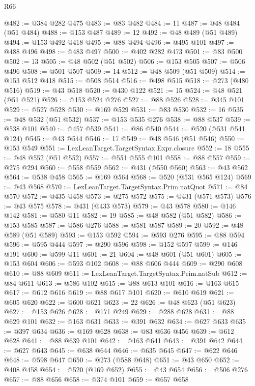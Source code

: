 \begin{lexlean}{R66}
\begin{coremodule}
@482 := @384 @282 @475
@483 := @83 @482
@484 := 11
@487 := @48 @484 (@51 @484)
@488 := @153 @487
@489 := 12
@492 := @48 @489 (@51 @489)
@494 := @153 @492 @418
@495 := @88 @494
@496 := @495 @101
@497 := @488 @496
@498 := @483 @497
@500 := @402 @282 @473
@501 := @83 @500
@502 := 13
@505 := @48 @502 (@51 @502)
@506 := @153 @505
@507 := @506 @496
@508 := @501 @507
@509 := 14
@512 := @48 @509 (@51 @509)
@514 := @153 @512 @418
@515 := @508 @514
@516 := @498 @515
@518 := @273 (@480 @516)
@519 := @43 @518
@520 := @430 @122
@521 := 15
@524 := @48 @521 (@51 @521)
@526 := @153 @524 @276
@527 := @88 @526
@528 := @345 @101
@529 := @527 @528
@530 := @169 @529
@531 := @83 @530
@532 := 16
@535 := @48 @532 (@51 @532)
@537 := @153 @535 @276
@538 := @88 @537
@539 := @538 @101
@540 := @457 @539
@541 := @86 @540
@544 := @520 (@531 @541 @124)
@545 := @43 @544
@546 := 17
@549 := @48 @546 (@51 @546)
@550 := @153 @549
@551 := LexLeanTarget.TargetSyntax.Expr.closure
@552 := 18
@555 := @48 @552 (@51 @552)
@557 := @551 @555 @101
@558 := @88 @557
@559 := @275 @294
@560 := @558 @559
@562 := @431 (@550 @560)
@563 := @43 @562
@564 := @538 @458
@565 := @169 @564
@568 := @520 (@531 @565 @124)
@569 := @43 @568
@570 := LexLeanTarget.TargetSyntax.Prim.natQuot
@571 := @84 @570
@572 := @435 @458
@573 := @275 @572
@575 := @431 (@571 @573)
@576 := @43 @575
@578 := @431 (@433 @573)
@579 := @43 @578
@580 := @146 @142
@581 := @580 @11
@582 := 19
@585 := @48 @582 (@51 @582)
@586 := @153 @585
@587 := @586 @276
@588 := @581 @587
@589 := 20
@592 := @48 @589 (@51 @589)
@593 := @153 @592
@594 := @593 @276
@595 := @88 @594
@596 := @595 @444
@597 := @290 @596
@598 := @152 @597
@599 := @146 @191
@600 := @599 @11
@601 := 21
@604 := @48 @601 (@51 @601)
@605 := @153 @604
@606 := @593 @102
@608 := @88 @606 @444
@609 := @290 @608
@610 := @88 @609
@611 := LexLeanTarget.TargetSyntax.Prim.natSub
@612 := @84 @611
@613 := @586 @102
@615 := @88 @613 @101
@616 := @163 @615
@617 := @612 @616
@619 := @88 @617 @101
@620 := @610 @619
@621 := @605 @620
@622 := @600 @621
@623 := 22
@626 := @48 @623 (@51 @623)
@627 := @153 @626
@628 := @171 @249
@629 := @288 @628
@631 := @88 @629 @101
@632 := @163 @631
@633 := @391 @632
@634 := @627 @633
@635 := @397 @634
@636 := @169 @628
@638 := @83 @636 @456
@639 := @612 @628
@641 := @88 @639 @101
@642 := @163 @641
@643 := @391 @642
@644 := @627 @643
@645 := @638 @644
@646 := @635 @645
@647 := @622 @646
@648 := @598 @647
@650 := @273 (@588 @648)
@651 := @43 @650
@652 := @408 @458
@654 := @520 (@169 @652)
@655 := @43 @654
@656 := @506 @276
@657 := @88 @656
@658 := @374 @101
@659 := @657 @658

\end{coremodule}
\end{lexlean}
